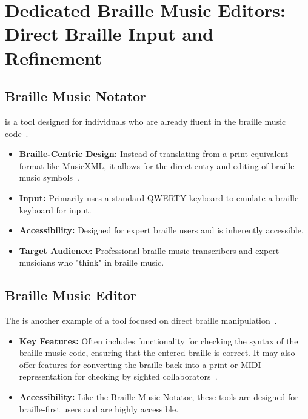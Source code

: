 \section{Dedicated Braille Music Editors: Direct Braille Input and Refinement}\label{ch10:sec:dedicated-editors}

\subsection{Braille Music Notator}\label{ch10:ssec:braille-music-notator}
 is a tool designed for individuals who are already fluent in the braille music code~\supercite{braillemusicnotator, pathstoliteracy-notator, braillemusicnotator-quickstart}.
\begin{itemize}
	\item \textbf{Braille-Centric Design:} Instead of translating from a print-equivalent format like \gls{MusicXML}, it allows for the direct entry and editing of braille music symbols~\supercite{braillemusicnotator}.
	\item \textbf{Input:} Primarily uses a standard QWERTY keyboard to emulate a braille keyboard for input.
	\item \textbf{Accessibility:} Designed for expert braille users and is inherently accessible.
	\item \textbf{Target Audience:} Professional braille music transcribers and expert musicians who "think" in braille music.
\end{itemize}

\subsection{Braille Music Editor}\label{ch10:ssec:braille-music-editor}
The  is another example of a tool focused on direct braille manipulation~\supercite{braillemusiceditor}.
\begin{itemize}
	\item \textbf{Key Features:} Often includes functionality for checking the syntax of the braille music code, ensuring that the entered braille is correct. It may also offer features for converting the braille back into a print or MIDI representation for checking by sighted collaborators~\supercite{braillemusiceditor}.
	\item \textbf{Accessibility:} Like the Braille Music Notator, these tools are designed for braille-first users and are highly accessible.
\end{itemize}

